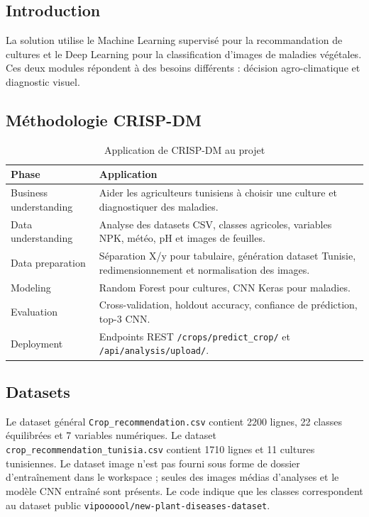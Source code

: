 \subsection{Introduction}
La solution utilise le Machine Learning supervisé pour la recommandation de cultures et le Deep Learning pour la classification d'images de maladies végétales. Ces deux modules répondent à des besoins différents : décision agro-climatique et diagnostic visuel.

\subsection{Méthodologie CRISP-DM}
\begin{table}[H]
\centering
\caption{Application de CRISP-DM au projet}
\begin{tabular}{p{3.2cm}p{10cm}}
\toprule
\textbf{Phase} & \textbf{Application} \\
\midrule
Business understanding & Aider les agriculteurs tunisiens à choisir une culture et diagnostiquer des maladies. \\
Data understanding & Analyse des datasets CSV, classes agricoles, variables NPK, météo, pH et images de feuilles. \\
Data preparation & Séparation X/y pour tabulaire, génération dataset Tunisie, redimensionnement et normalisation des images. \\
Modeling & Random Forest pour cultures, CNN Keras pour maladies. \\
Evaluation & Cross-validation, holdout accuracy, confiance de prédiction, top-3 CNN. \\
Deployment & Endpoints REST \texttt{/crops/predict\_crop/} et \texttt{/api/analysis/upload/}. \\
\bottomrule
\end{tabular}
\end{table}

\subsection{Datasets}
Le dataset général \texttt{Crop\_recommendation.csv} contient 2200 lignes, 22 classes équilibrées et 7 variables numériques. Le dataset \texttt{crop\_recommendation\_tunisia.csv} contient 1710 lignes et 11 cultures tunisiennes. Le dataset image n'est pas fourni sous forme de dossier d'entraînement dans le workspace ; seules des images médias d'analyses et le modèle CNN entraîné sont présents. Le code indique que les classes correspondent au dataset public \texttt{vipoooool/new-plant-diseases-dataset}.

